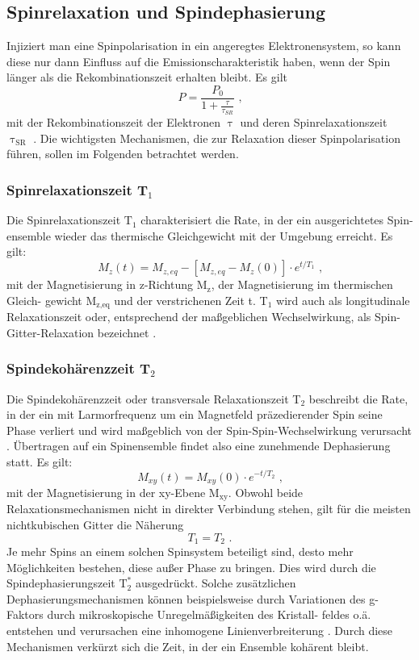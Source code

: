 \subsection{Spinrelaxation und Spindephasierung}
Injiziert man eine Spinpolarisation in ein angeregtes Elektronensystem, so kann diese nur dann Einfluss auf die Emissionscharakteristik haben, wenn der Spin länger als die Rekombinationszeit erhalten bleibt. Es gilt
\begin{equation}
P=\frac{P_0}{1+ \frac{\tau}{\tau_{SR}}} \text{ ,}
\end{equation}
mit der Rekombinationszeit der Elektronen $\uptau$ und deren Spinrelaxationszeit $\uptau_\text{SR}$ \cite{Dyakonov.2008}. Die wichtigsten Mechanismen, die zur Relaxation dieser Spinpolarisation führen, sollen im Folgenden betrachtet werden.
\subsubsection{Spinrelaxationszeit T$_\text{1}$}
Die Spinrelaxationszeit $\text{T}_\text{1}$ charakterisiert die Rate, in der ein ausgerichtetes Spin- ensemble wieder das thermische Gleichgewicht mit der Umgebung erreicht. Es gilt:
\begin{equation}
M_z(t)=M_{z,eq} -\left[ M_{z,eq}-M_z(0)\right]\cdot e^{t/T_1} \text{ ,}
\end{equation}
mit der Magnetisierung in z-Richtung $\text{M}_\text{z}$, der Magnetisierung im thermischen Gleich- gewicht M$_\text{z,eq}$ und der verstrichenen Zeit t. T$_\text{1}$ wird auch als longitudinale Relaxationszeit oder, entsprechend der maßgeblichen Wechselwirkung, als Spin-Gitter-Relaxation bezeichnet \cite{Zutic.2004}.\\
\subsubsection{Spindekohärenzzeit T$_\text{2}$}
Die Spindekohärenzzeit oder transversale Relaxationszeit T$_\text{2}$ beschreibt die Rate, in der ein mit Larmorfrequenz um ein Magnetfeld präzedierender Spin seine Phase verliert und wird maßgeblich von der Spin-Spin-Wechselwirkung verursacht \cite{Fabian.2007}. Übertragen auf ein Spinensemble findet also eine zunehmende Dephasierung statt. Es gilt:
\begin{equation}
M_{xy}(t)=M_{xy}(0)\cdot e^{-t/T_2} \text{ ,}
\end{equation}
mit der Magnetisierung in der xy-Ebene $\text{M}_\text{xy}$. Obwohl beide Relaxationsmechanismen nicht in direkter Verbindung stehen, gilt für die meisten nichtkubischen Gitter die Näherung \cite{Fabian.2007} 
\begin{equation}
T_1 = T_2 \text{ .}
\end{equation}
Je mehr Spins an einem solchen Spinsystem beteiligt sind, desto mehr Möglichkeiten bestehen, diese außer Phase zu bringen. Dies wird durch die Spindephasierungszeit $\text{T}_\text{2}^\ast$ ausgedrückt. Solche zusätzlichen Dephasierungsmechanismen können beispielsweise durch Variationen des g-Faktors durch mikroskopische Unregelmäßigkeiten des Kristall- feldes o.ä. entstehen und verursachen eine inhomogene Linienverbreiterung \cite{Fabian.2007}. Durch diese Mechanismen verkürzt sich die Zeit, in der ein Ensemble kohärent bleibt.
